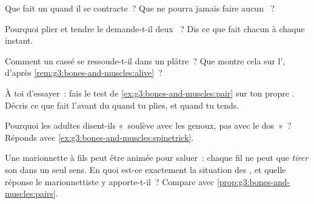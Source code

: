 \begin{exercise}[$\star$]\label{exo:g3:bones-and-muscles:5}
Que fait un  quand il se contracte~? Que ne pourra jamais
faire aucun ~?
\end{exercise}

\begin{exercise}[$\star$]\label{exo:g3:bones-and-muscles:6}
Pourquoi plier et tendre le  demande-t-il deux ~? Dis ce
que fait chacun à chaque instant.
\end{exercise}

\begin{exercise}[$\star$]\label{exo:g3:bones-and-muscles:7}
Comment un  cassé se ressoude-t-il dans un plâtre~? Que montre
cela sur l', d'après \cref{rem:g3:bones-and-muscles:alive}~?
\end{exercise}

\begin{exercise}[$\star$]\label{exo:g3:bones-and-muscles:8}
À toi d'essayer~: fais le test de \cref{ex:g3:bones-and-muscles:pair}
sur ton propre . Décris ce que fait l'avant du  quand tu
plies, et quand tu tends.
\end{exercise}

\begin{exercise}[$\star\star$]\label{exo:g3:bones-and-muscles:9}
Pourquoi les adultes disent-ils «~soulève avec les genoux, pas avec
le dos~»~? Réponds avec \cref{ex:g3:bones-and-muscles:spinetrick}.
\end{exercise}

\begin{exercise}[$\star\star$]\label{exo:g3:bones-and-muscles:10}
Une marionnette à fils peut être animée pour saluer~: chaque fil ne
peut que \emph{tirer} son  dans un seul sens. En quoi est-ce
exactement la situation des , et quelle réponse le
marionnettiste y apporte-t-il~? Compare avec
\cref{prop:g3:bones-and-muscles:pairs}.
\end{exercise}
